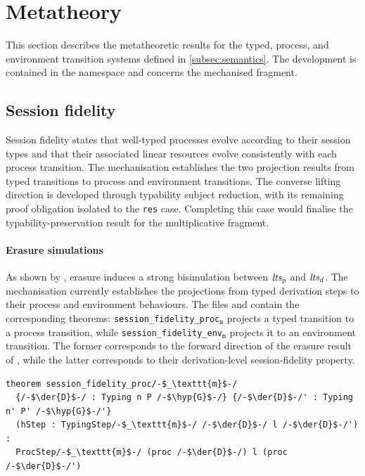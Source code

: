 \section{Metatheory}\label{sec:metatheory}
This section describes the metatheoretic results for the typed, process, and environment transition systems defined in \cref{subsec:semantics}. The development is contained in the  namespace and concerns the mechanised \pimll{} fragment.

\subsection{Session fidelity}\label{subsec:session-fidelity}
Session fidelity states that well-typed processes evolve according to their session types and that their associated linear resources evolve consistently with each process transition. The mechanisation establishes the two projection results from typed transitions to process and environment transitions. The converse lifting direction is developed through typability subject reduction, with its remaining proof obligation isolated to the \texttt{res} case. Completing this case would finalise the typability-preservation result for the multiplicative fragment.

\paragraph{Erasure simulations} As shown by \citet[Theorem~4.7]{abs-2106-11818}, erasure induces a strong bisimulation between $\mathit{lts_{p}}$ and $\mathit{lts_{d}}$. The mechanisation currently establishes the projections from typed derivation steps to their process and environment behaviours. The files  and  contain the corresponding theorems: \texttt{session\_fidelity\_proc}$_\texttt{m}$ projects a typed transition to a process transition, while \texttt{session\_fidelity\_env}$_\texttt{m}$ projects it to an environment transition. The former corresponds to the forward direction of the erasure result of \citet{abs-2106-11818}, while the latter corresponds to their derivation-level session-fidelity property.

\begin{lstlisting}[language=Lean4]
theorem session_fidelity_proc/-$_\texttt{m}$-/
  {/-$\der{D}$-/ : Typing n P /-$\hyp{G}$-/} {/-$\der{D}$-/' : Typing n' P' /-$\hyp{G}$-/'}
  (hStep : TypingStep/-$_\texttt{m}$-/ /-$\der{D}$-/ l /-$\der{D}$-/') :
  ProcStep/-$_\texttt{m}$-/ (proc /-$\der{D}$-/) l (proc /-$\der{D}$-/')
\end{lstlisting}


